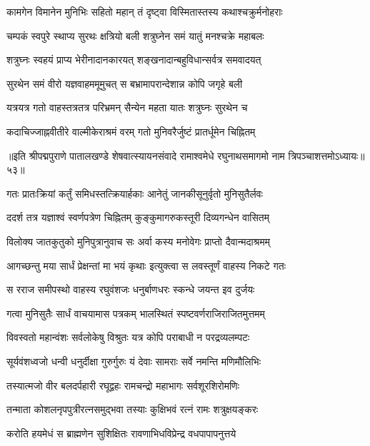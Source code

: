 \twolineshloka
{कामगेन विमानेन मुनिभिः सहितो महान्}
{तं दृष्ट्वा विस्मितास्तस्य कथाश्चक्रुर्मनोहराः}%

\twolineshloka
{चम्पकं स्वपुरे स्थाप्य सुरथः क्षत्रियो बली}
{शत्रुघ्नेन समं यातुं मनश्चक्रे महाबलः}%

\twolineshloka
{शत्रुघ्नः स्वहयं प्राप्य भेरीनादानकारयत्}
{शङ्खनादान्बहुविधान्सर्वत्र समवादयत्}%

\twolineshloka
{सुरथेन समं वीरो यज्ञवाहममूमुचत्}
{स बभ्रामापरान्देशान्न कोपि जगृहे बली}%

\twolineshloka
{यत्रयत्र गतो वाहस्तत्रतत्र परिभ्रमन्}
{सैन्येन महता यातः शत्रुघ्नः सुरथेन च}%

\twolineshloka
{कदाचिज्जाह्नवीतीरे वाल्मीकेराश्रमं वरम्}
{गतो मुनिवरैर्जुष्टं प्रातर्धूमेन चिह्नितम्}%

{॥इति श्रीपद्मपुराणे पातालखण्डे शेषवात्स्यायनसंवादे रामाश्वमेधे रघुनाथसमागमो नाम त्रिपञ्चाशत्तमोऽध्यायः॥५३॥}

\resetShloka


\twolineshloka
{गतः प्रातःक्रियां कर्तुं समिधस्तत्क्रियार्हकाः}
{आनेतुं जानकीसूनुर्वृतो मुनिसुतैर्लवः}%

\twolineshloka
{ददर्श तत्र यज्ञाश्वं स्वर्णपत्रेण चिह्नितम्}
{कुङ्कुमागरुकस्तूरी दिव्यगन्धेन वासितम्}%

\twolineshloka
{विलोक्य जातकुतुको मुनिपुत्रानुवाच सः}
{अर्वा कस्य मनोवेगः प्राप्तो दैवान्मदाश्रमम्}%

\twolineshloka
{आगच्छन्तु मया सार्धं प्रेक्षन्तां मा भयं कृथाः}
{इत्युक्त्वा स लवस्तूर्णं वाहस्य निकटे गतः}%

\twolineshloka
{स रराज समीपस्थो वाहस्य रघुवंशजः}
{धनुर्बाणधरः स्कन्धे जयन्त इव दुर्जयः}%

\twolineshloka
{गत्वा मुनिसुतैः सार्धं वाचयामास पत्रकम्}
{भालस्थितं स्पष्टवर्णराजिराजितमुत्तमम्}%

\twolineshloka
{विवस्वतो महान्वंशः सर्वलोकेषु विश्रुतः}
{यत्र कोपि पराबाधी न परद्रव्यलम्पटः}%

\twolineshloka
{सूर्यवंशध्वजो धन्वी धनुर्दीक्षा गुरुर्गुरुः}
{यं देवाः सामराः सर्वे नमन्ति मणिमौलिभिः}%

\twolineshloka
{तस्यात्मजो वीर बलदर्पहारी रघूद्वहः}
{रामचन्द्रो महाभागः सर्वशूरशिरोमणिः}%

\twolineshloka
{तन्माता कोशलनृपपुत्रीरत्नसमुद्भवा}
{तस्याः कुक्षिभवं रत्नं रामः शत्रुक्षयङ्करः}%

\twolineshloka
{करोति हयमेधं स ब्राह्मणेन सुशिक्षितः}
{रावणाभिधविप्रेन्द्र वधपापापनुत्तये}%

